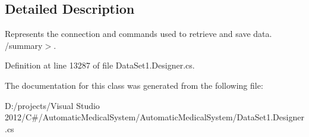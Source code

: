 \subsection{Detailed Description}
Represents the connection and commands used to retrieve and save data. /summary$>$. 

Definition at line 13287 of file DataSet1.Designer.cs.

The documentation for this class was generated from the following file:\begin{CompactItemize}
\item 
D:/projects/Visual Studio 2012/C\#/AutomaticMedicalSystem/AutomaticMedicalSystem/DataSet1.Designer.cs\end{CompactItemize}
